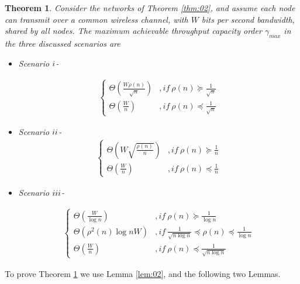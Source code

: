 \documentclass[journal]{IEEEtran}
\theoremstyle{plain}
\newtheorem{theorem}{Theorem}
\theoremstyle{remark}
\begin{document}
\begin{theorem}\label{thm:03}
Consider the networks of Theorem \ref{thm:02}, and assume each node can transmit over a common wireless channel, with $W$ bits per second bandwidth, shared by all nodes. The maximum achievable throughput capacity order $\gamma_{max}$  in the three discussed scenarios are
	
	\begin{itemize}
		\item Scenario $\romannumeral 1$- 
		
		\begin{eqnarray}
			\left\{\begin{array}{ll}
					\Theta(\frac{W\rho(n)}{\sqrt{n}})& ,if\ \rho(n)\succeq \frac{1}{\sqrt{n}} \\
					\Theta(\frac{W}{n})& ,if\ \rho(n)\preceq \frac{1}{\sqrt{n}} \nonumber
		\end{array}\right .
		\end{eqnarray}
		
		\item Scenario $\romannumeral 2$- 
		\begin{eqnarray}
			\left\{\begin{array}{ll}
					\Theta(W\sqrt{\frac{\rho(n)}{n}})& ,if\ \rho(n)\succeq \frac{1}{n} \\
					\Theta(\frac{W}{n})& ,if\ \rho(n)\preceq \frac{1}{n} \nonumber
		\end{array}\right .
		\end{eqnarray}		
		
		\item Scenario $\romannumeral 3$-	
		
		\begin{eqnarray}
			\left\{\begin{array}{ll}
					\Theta(\frac{W}{\log n})& ,if\ \rho(n)\succeq \frac{1}{\log n} \\
					\Theta(\rho^2(n)\log n W)& ,if\ \frac{1}{\sqrt{n\log n}} \preceq \rho(n) \preceq \frac{1}{\log n} \\
					\Theta(\frac{W}{n})& ,if\ \rho(n)\preceq \frac{1}{\sqrt{n\log n}} \nonumber
		\end{array}\right .
		\end{eqnarray}
		\end{itemize}
\end{theorem}

To prove Theorem \ref{thm:03} we use Lemma \ref{lem:02}, and the following two Lemmas.
\end{document}
